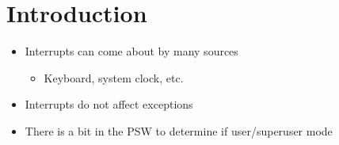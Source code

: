 \documentclass[12pt]{article}
\begin{document}
\section{Introduction}

\begin{itemize}
    \item Interrupts can come about by many sources
    \begin{itemize}
        \item Keyboard, system clock, etc.
    \end{itemize}

    \item Interrupts do not affect exceptions
    \item There is a bit in the PSW to determine if user/superuser mode
\end{itemize}
\end{document}

